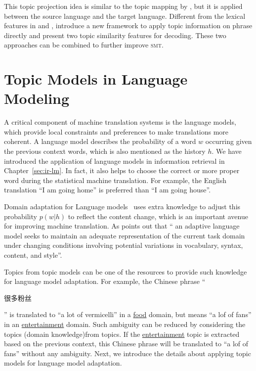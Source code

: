 This topic projection idea is similar to the topic mapping by \citet{su-12}, but it is applied between the source language and the target language. Different from the lexical features in \citet{Eidelman-12} and \citet{hu-14}, \citet{xiao-12} introduce a new framework to apply topic information on phrase directly and present two topic similarity features for decoding. These two approaches can be combined to further improve \textsc{smt}.



\section{Topic Models in Language Modeling}


A critical component of machine translation systems is the language models, which provide local constraints and preferences to make translations more coherent. A language model describes the probability of a word $w$ occurring given the previous context words, which is also mentioned as the history $h$. We have introduced the application of language models in information retrieval in Chapter~\ref{sec:ir-lm}. In fact, it also helps to choose the correct or more proper word during the statistical machine translation. For example, the English translation ``I am going home'' is preferred than ``I am going house''. 

Domain adaptation for Language models~\citep{Bellegarda-04,wood-09} uses extra knowledge to adjust this probability $p(w|h)$ to reflect the content change, which is an important avenue for improving machine translation. As \citet{Bellegarda-04} points out that `` an adaptive language model seeks to maintain an adequate representation of the current task domain under changing conditions involving potential variations in vocabulary, syntax, content, and style''.

Topics from topic models can be one of the resources to provide such knowledge for language model adaptation. For example, the Chinese phrase ``\begin{CJK*}{UTF8}{gbsn}很多粉丝\end{CJK*}'' is translated to ``a lot of vermicelli'' in a \underline{food} domain, but means ``a lof of fans'' in an \underline{entertainment} domain. Such ambiguity can be reduced by considering the topics (domain knowledge)from topics. If the \underline{entertainment} topic is extracted based on the previous context, this Chinese phrase will be translated to ``a lof of fans'' without any ambiguity. Next, we introduce the details about applying topic models for language model adaptation.

